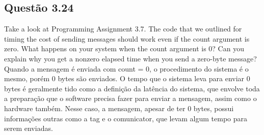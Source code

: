 

\subsection{Questão 3.24}
Take a look at Programming Assignment 3.7. The code that we outlined for timing the cost of sending messages should work even if the count argument is zero. What happens on your system when the count argument is 0? Can you explain why you get a nonzero elapsed time when you send a zero-byte message?\\

Quando a mensagem é enviada com count = 0, o procedimento do sistema é o mesmo, porém 0 bytes são enviados. O tempo que o sistema leva para enviar 0 bytes é geralmente tido como a definição da latência do sistema, que envolve toda a preparação que o software precisa fazer para enviar a mensagem, assim como o hardware também. Nesse caso, a mensagem, apesar de ter 0 bytes, possui informações outras como a tag e o comunicator, que levam algum tempo para serem enviadas.

